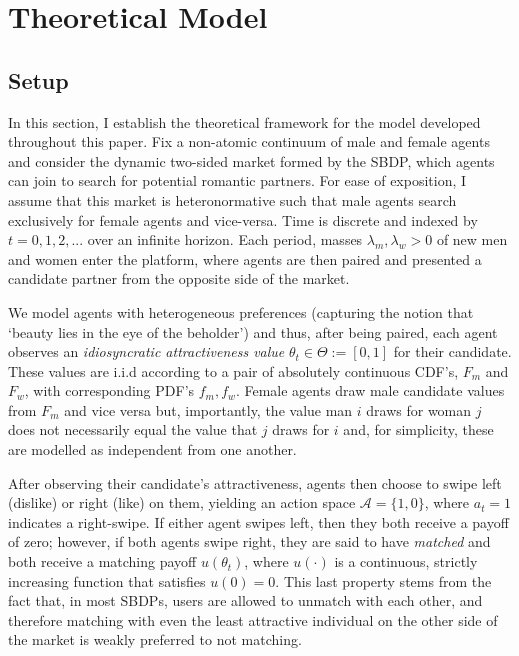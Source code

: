 \section{Theoretical Model}
\label{sec:section2}
\subsection{Setup}\label{sec:section2.1} 
In this section, I establish the theoretical framework for the model developed throughout this paper. Fix a non-atomic continuum of male and female agents and consider the dynamic two-sided market formed by the SBDP, which agents can join to search for potential romantic partners. 
For ease of exposition, I assume that this market is heteronormative such that male agents search exclusively for female agents and vice-versa. 
Time is discrete and indexed by $t=0, 1, 2, ...$ over an infinite horizon. Each period, masses $\lambda_m, \lambda_w>0$ of new men and women enter the platform, where agents are then paired and presented a candidate partner from the opposite side of the market. 

We model agents with heterogeneous preferences (capturing the notion that `beauty lies in the eye of the beholder') and thus, after being paired, each agent observes an \textit{idiosyncratic attractiveness value} $\theta_t \in \Theta := [0,1]$ for their candidate. 
These values are i.i.d according to a pair of absolutely continuous CDF's, $F_m$ and $F_w$, with corresponding PDF's $f_m,f_w$. 
Female agents draw male candidate values from $F_m$ and vice versa but, importantly, the value man $i$ draws for woman $j$ does not necessarily equal the value that $j$ draws for $i$ and, for simplicity, these are modelled as independent from one another.

After observing their candidate's attractiveness, agents then choose to swipe left (dislike) or right (like) on them, yielding an action space $\mathcal{A}=\{ 1, 0\}$, where $a_t=1$ indicates a right-swipe. 
If either agent swipes left, then they both receive a payoff of zero; however, if both agents swipe right, they are said to have \textit{matched} and both receive a matching payoff $u(\theta_t)$, where $u(\cdot)$ is a continuous, strictly increasing function that satisfies $u(0) = 0$. 
This last property stems from the fact that, in most SBDPs, users are allowed to unmatch with each other, and therefore matching with even the least attractive individual on the other side of the market is weakly preferred to not matching. 

